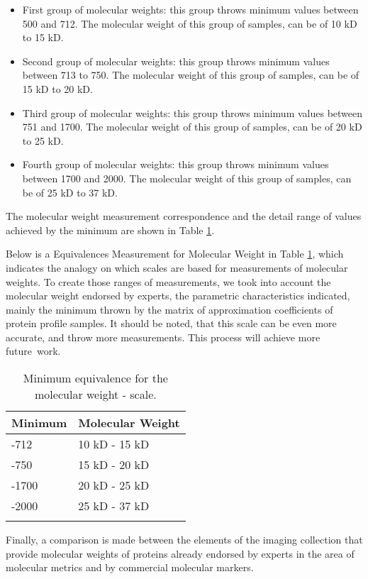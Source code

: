 \documentclass[a4paper]{llncs}
\begin{document}
\begin{itemize}
\item First group of molecular weights: this group throws minimum values between 500 and 712. The molecular weight of this group of samples, can be of 10 kD to 15 kD.
\item Second group of molecular weights: this group throws minimum values between 713 to 750. The molecular weight of this group of samples, can be of 15 kD to 20 kD.
\item Third group of molecular weights: this group throws minimum values between 751 and 1700. The molecular weight of this group of samples, can be of 20 kD to 25 kD.
\item Fourth group of molecular weights: this group throws minimum values between 1700 and 2000. The molecular weight of this group of samples, can be of 25 kD to 37 kD.
\end{itemize}

The molecular weight measurement correspondence and the detail range of values achieved by the minimum are shown in Table \ref{equivalencias}.

Below is a Equivalences Measurement for Molecular Weight in Table \ref{equivalencias}, which indicates the analogy on which scales are based for measurements of molecular weights. To create those ranges of measurements, we took into account the molecular weight endorsed by experts, the parametric characteristics indicated, mainly the minimum thrown by the matrix of approximation coefficients of protein profile samples. It should be noted, that this scale can be even more accurate, and throw more measurements. This process will achieve more future~work.

\begin{table}
\centering
\caption{Minimum equivalence for the molecular weight - scale.}
\begin{tabular}{p{3cm} p{3cm}}
\hline
\centering
Minimum  & Molecular Weight \\ \hline
\hline \centering
500 -712  &  10 kD - 15 kD\\
\hline \centering
713-750  &   15 kD - 20 kD\\
\hline \centering
751-1700 &  20 kD - 25 kD\\
\hline \centering
1700-2000 & 25 kD - 37 kD\\
\hline \centering
\end{tabular}
\label{equivalencias}
\end{table}


Finally, a comparison is made between the elements of the imaging collection that provide molecular weights of proteins already endorsed by experts in the area of molecular metrics and by commercial molecular markers.
\end{document}
